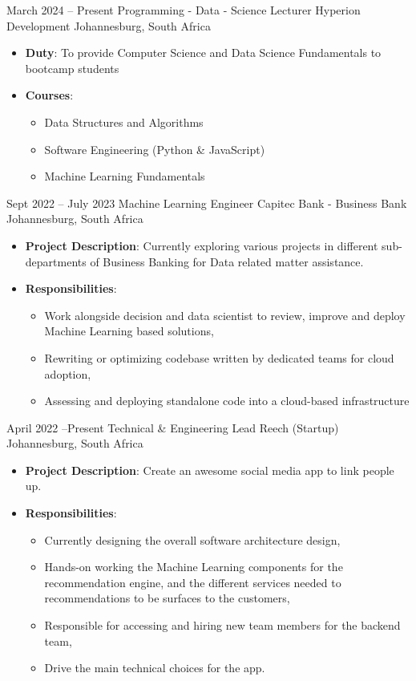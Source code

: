 \documentclass[11pt, letterpaper]{moderncv}        %
\begin{document}
\cventry
{March 2024 -- Present}
{Programming - Data - Science Lecturer}
{Hyperion Development}
{Johannesburg, South Africa}
{}
{\begin{itemize}%
		\item \textbf{Duty}: To provide Computer Science and Data Science Fundamentals to bootcamp students
		\item \textbf{Courses}:
		\begin{itemize}
			\item Data Structures and Algorithms
			\item Software Engineering (Python \& JavaScript) 
			\item Machine Learning Fundamentals
		\end{itemize}
\end{itemize}}


\cventry
{Sept 2022 -- July 2023}
{Machine Learning Engineer}
{Capitec Bank - Business Bank}
{Johannesburg, South Africa}
{}
{\begin{itemize}%
		\item \textbf{Project Description}: Currently exploring various projects in different sub-departments of Business Banking for Data related matter assistance.
		\item \textbf{Responsibilities}:
		\begin{itemize}
			\item Work alongside decision and data scientist to review, improve and deploy Machine Learning based solutions,
			\item Rewriting or optimizing codebase written by dedicated teams for cloud adoption,
			\item Assessing and deploying standalone code into a cloud-based infrastructure
		\end{itemize}
\end{itemize}}

\cventry
{April 2022 --Present}
{Technical \& Engineering Lead}
{Reech (Startup)}
{Johannesburg, South Africa}
{}
{\begin{itemize}%
		\item \textbf{Project Description}: Create an awesome social media app to link people up.
		\item \textbf{Responsibilities}:
		\begin{itemize}
			\item Currently designing the overall software architecture design, 
			\item Hands-on working the Machine Learning components for the recommendation engine,  and the different services needed to recommendations to be surfaces to the customers,
			\item Responsible for accessing and hiring new team members for the backend team,
			\item Drive the main technical choices for the app.
		\end{itemize}
\end{itemize}}
\end{document}
